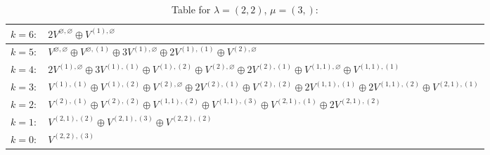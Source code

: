 \documentclass[a4paper,12pt]{article}
\begin{document}
\renewcommand{\arraystretch}{1.6} 
\begin{table}[H]
\centering
\caption{Table for $\lambda = (2, 2)$, $\mu = (3,)$:}
\begin{tabular}{|>{\centering\arraybackslash}p{15cm}|}
\hline
 $k = 6: \quad 2 V^{\varnothing, \varnothing} \oplus V^{(1), \varnothing} $ \\ \hline
 $k = 5: \quad V^{\varnothing, \varnothing} \oplus V^{\varnothing, (1)} \oplus 3 V^{(1), \varnothing} \oplus 2 V^{(1), (1)} \oplus V^{(2), \varnothing} $ \\ \hline
 $k = 4: \quad 2 V^{(1), \varnothing} \oplus 3 V^{(1), (1)} \oplus V^{(1), (2)} \oplus V^{(2), \varnothing} \oplus 2 V^{(2), (1)} \oplus V^{(1, 1), \varnothing} \oplus V^{(1, 1), (1)} $ \\ \hline
 $k = 3: \quad V^{(1), (1)} \oplus V^{(1), (2)} \oplus V^{(2), \varnothing} \oplus 2 V^{(2), (1)} \oplus V^{(2), (2)} \oplus 2 V^{(1, 1), (1)} \oplus 2 V^{(1, 1), (2)} \oplus V^{(2, 1), (1)} $ \\ \hline
 $k = 2: \quad V^{(2), (1)} \oplus V^{(2), (2)} \oplus V^{(1, 1), (2)} \oplus V^{(1, 1), (3)} \oplus V^{(2, 1), (1)} \oplus 2 V^{(2, 1), (2)} $ \\ \hline
 $k = 1: \quad V^{(2, 1), (2)} \oplus V^{(2, 1), (3)} \oplus V^{(2, 2), (2)} $ \\ \hline
 $k = 0: \quad V^{(2, 2), (3)} $ \\ \hline
\end{tabular}
\end{table}
\end{document}
